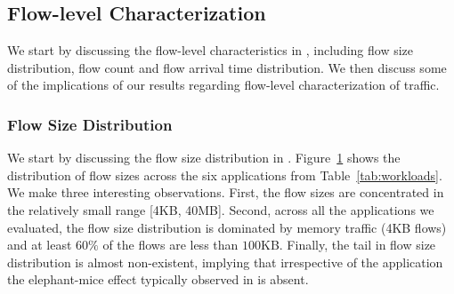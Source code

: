 %
\begin{figure}
  \centering
  \caption{\small{}}
  \label{fig:fsd}
\end{figure}
%

\subsection{Flow-level Characterization} 
\label{ssec:flc}
We start by discussing the flow-level characteristics in \dis, including flow size distribution, flow count and flow arrival time distribution. We then discuss some of the implications of our results regarding flow-level characterization of \dis traffic.

\subsubsection{Flow Size Distribution}
We start by discussing the flow size distribution in \dis. Figure~\ref{fig:fsd} shows the distribution of flow sizes across the six applications from Table~\ref{tab:workloads}. We make three interesting observations. First, the flow sizes are concentrated in the relatively small range [4KB, 40MB]. Second, across all the applications we evaluated, the flow size distribution is dominated by memory traffic (4KB flows) and at least $60\%$ of the flows are less than $100$KB. Finally, the tail in flow size distribution is almost non-existent, implying that irrespective of the application the elephant-mice effect typically observed in \pdis is absent.

